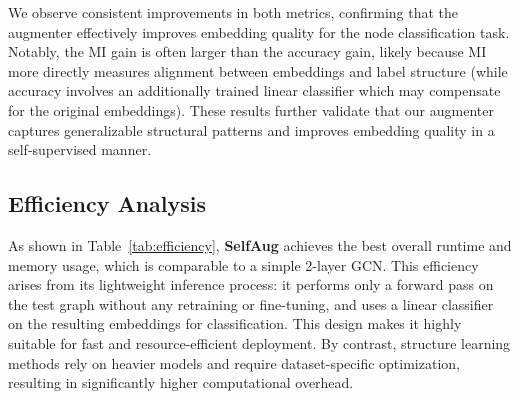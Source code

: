 \documentclass[letterpaper]{article} \usepackage{aaai2026}  \usepackage{times}  \usepackage{helvet}  \usepackage{courier}  \usepackage[hyphens]{url}  \usepackage{graphicx} \urlstyle{rm} \def\UrlFont{\rm}  \usepackage{natbib}  \usepackage{caption} \frenchspacing  \setlength{\pdfpagewidth}{8.5in}  \setlength{\pdfpageheight}{11in}
\begin{document}
We observe consistent improvements in both metrics, confirming that the augmenter effectively improves embedding quality for the node classification task. Notably, the MI gain is often larger than the accuracy gain, likely because MI more directly measures alignment between embeddings and label structure (while accuracy involves an additionally trained linear classifier which may compensate for the original embeddings). These results further validate that our augmenter captures generalizable structural patterns and improves embedding quality in a self-supervised manner.

\subsection{Efficiency Analysis}

As shown in Table~\ref{tab:efficiency}, \textbf{SelfAug} achieves the best overall runtime and memory usage, which is comparable to a simple 2-layer GCN. This efficiency arises from its lightweight inference process: it performs only a forward pass on the test graph without any retraining or fine-tuning, and uses a linear classifier on the resulting embeddings for classification.
This design makes it highly suitable for fast and resource-efficient deployment. By contrast, structure learning methods rely on heavier models and require dataset-specific optimization, resulting in significantly higher computational overhead.

\begin{table}[t]
\centering
\small
{}
\caption{Comparison of average runtime till convergence (in seconds) and peak GPU memory usage (in MB) across methods on \textsc{Cora}. \textbf{\dag} and \textbf{\ddag} denote the best and second-best results, respectively.}
\label{tab:efficiency}
\end{table}
\end{document}
